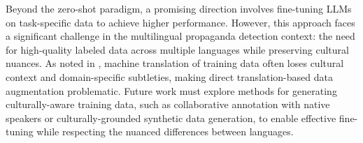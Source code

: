 Beyond the zero-shot paradigm, a promising direction involves fine-tuning LLMs on task-specific data to achieve higher performance. 
However, this approach faces a significant challenge in the multilingual propaganda detection context: the need for high-quality labeled data across multiple languages while preserving cultural nuances. As noted in \citep{eljadiri-nurbakova-2025-team}, machine translation of training data often loses cultural context and domain-specific subtleties, making direct translation-based data augmentation problematic. Future work must explore methods for generating culturally-aware training data, such as collaborative annotation with native speakers or culturally-grounded synthetic data generation, to enable effective fine-tuning while respecting the nuanced differences between languages.